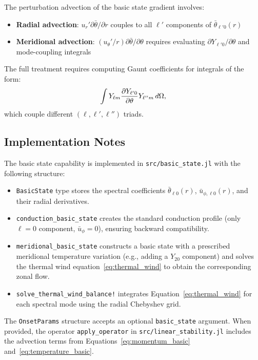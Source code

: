 \documentclass[11pt]{article}
\numberwithin{equation}{section}
\begin{document}
The perturbation advection of the basic state gradient involves:
\begin{itemize}
  \item \textbf{Radial advection}: $u_r' \partial\bar{\theta}/\partial r$ couples to all $\ell'$ components of $\bar{\theta}_{\ell'0}(r)$
  \item \textbf{Meridional advection}: $(u_\theta'/r) \partial\bar{\theta}/\partial\theta$ requires evaluating $\partial Y_{\ell'0}/\partial\theta$ and mode-coupling integrals
\end{itemize}

The full treatment requires computing Gaunt coefficients for integrals of the form:
\begin{equation}
  \int Y_{\ell m} \pdv{Y_{\ell' 0}}{\theta} Y_{\ell'' m} \,d\Omega,
  \label{eq:gaunt_integral}
\end{equation}
which couple different $(\ell, \ell', \ell'')$ triads.

\subsection{Implementation Notes}

The basic state capability is implemented in \texttt{src/basic\_state.jl} with the following structure:

\begin{itemize}
  \item \texttt{BasicState} type stores the spectral coefficients $\bar{\theta}_{\ell 0}(r)$, $\bar{u}_{\phi,\ell 0}(r)$, and their radial derivatives.

  \item \texttt{conduction\_basic\_state} creates the standard conduction profile (only $\ell=0$ component, $\bar{u}_\phi = 0$), ensuring backward compatibility.

  \item \texttt{meridional\_basic\_state} constructs a basic state with a prescribed meridional temperature variation (e.g., adding a $Y_{20}$ component) and solves the thermal wind equation~\eqref{eq:thermal_wind} to obtain the corresponding zonal flow.

  \item \texttt{solve\_thermal\_wind\_balance!} integrates Equation~\eqref{eq:thermal_wind} for each spectral mode using the radial Chebyshev grid.
\end{itemize}

The \texttt{OnsetParams} structure accepts an optional \texttt{basic\_state} argument. When provided, the operator \texttt{apply\_operator} in \texttt{src/linear\_stability.jl} includes the advection terms from Equations~\eqref{eq:momentum_basic} and~\eqref{eq:temperature_basic}.
\end{document}
